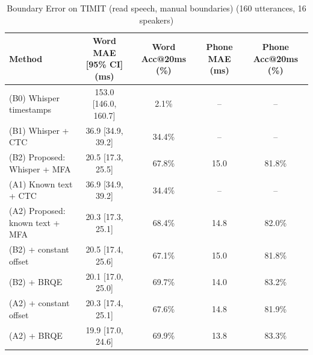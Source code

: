 \begin{table}[t]
\centering
\caption{Boundary Error on TIMIT (read speech, manual boundaries) (160 utterances, 16 speakers)}
\label{tab:alignment_accuracy}
\begin{tabular}{lcccc}
\toprule
Method & Word MAE [95\% CI] (ms) & Word Acc@20ms (\%) & Phone MAE (ms) & Phone Acc@20ms (\%) \\
\midrule
(B0) Whisper timestamps & 153.0 [146.0, 160.7] & 2.1\% & -- & -- \\
(B1) Whisper + CTC & 36.9 [34.9, 39.2] & 34.4\% & -- & -- \\
(B2) Proposed: Whisper + MFA & 20.5 [17.3, 25.5] & 67.8\% & 15.0 & 81.8\% \\
(A1) Known text + CTC & 36.9 [34.9, 39.2] & 34.4\% & -- & -- \\
(A2) Proposed: known text + MFA & 20.3 [17.3, 25.1] & 68.4\% & 14.8 & 82.0\% \\
(B2) + constant offset & 20.5 [17.4, 25.6] & 67.1\% & 15.0 & 81.8\% \\
(B2) + BRQE & 20.1 [17.0, 25.0] & 69.7\% & 14.0 & 83.2\% \\
(A2) + constant offset & 20.3 [17.4, 25.1] & 67.6\% & 14.8 & 81.9\% \\
(A2) + BRQE & 19.9 [17.0, 24.6] & 69.9\% & 13.8 & 83.3\% \\
\bottomrule
\end{tabular}
\end{table}
